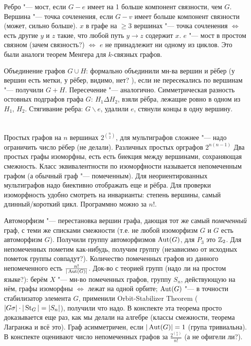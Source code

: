 Ребро "--- мост, если $G-e$ имеет на 1 больше компонент связности, чем $G$.
Вершина "--- точка сочленения, если $G-v$ имеет больше компонент связности (может, сильно больше).
$x$ в графе на $\ge 3$ вершинах "--- точка сочленения $\iff$ есть другие $y$ и $z$ такие, что любой путь $y\to z$ содержит $x$.
$e$ "--- мост в простом связном (\TODO зачем связность?) $\iff$ $e$ не принадлежит ни одному из циклов.
Это были аналоги теорем Менгера для $k$-связных графов.

Объединение графов $G\cup H$: формально объединили мн-ва вершин и рёбер (у вершин есть метки, у рёбер, видимо, нет? \TODO), если не пересекались по вершинам "--- получили $G+H$.
Пересечение "--- аналогично.
Симметрическая разность остовных подграфов графа $G$: $H_1 \Delta H_2$, взяли рёбра, лежащие ровно в одном из $H_1$, $H_2$.
Стягивание ребра: $G \backslash e$, удалили $e$, стянули концы в одну вершину.

\section{} %
Простых графов на $n$ вершинах $2^{\binom{n}{2}}$, для мультиграфов сложнее "--- надо ограничить число рёбер (не делали).
Различных простых орграфов $2^{n(n-1)}$
Два простых графы изоморфны, есть есть биекция между вершинами, сохраняющая смежность.
Класс эквивалентности по изоморфности называется непомеченным графом (а обычный граф "--- помеченным).
Для неориентированных мультиграфов надо биективно отображать еще и рёбра.
Для проверки изоморфность удобно смотреть на инварианты: степень вершины, самый длинный/короткий цикл.
Программно можно за $n!$.

Автоморфизм "--- перестановка вершин графа, дающая тот же самый \textit{помеченный} граф, с теми же списками смежности (т.е. не любой изоморфизм $G$ и $G$ есть автоморфизм $G$).
Получили группу автоморфизмов $\operatorname{Aut}(G)$, для $P_3$ это $\mathbb{Z}_2$.
Для непомеченных пометим как-нибудь, получим группу (\TODO независимо от исходных пометок группы совпадут?).
Количество помеченных графов из данного непомеченного есть $\frac{n!}{|\operatorname{Aut}(G)|}$.
Док-во с теорией групп (\TODO надо ли на простом языке?): берём $X$ "--- мн-во помеченных графов, группу $S_n$, действующую на нём, графы изоморфны $\iff$ лежат на одной орбите;
$\operatorname{Aut}(G)$ "--- в точности стабилизатор элемента $G$, применили Orbit-Stabilizer Theorem ($|G\sigma| \cdot |\operatorname{St}_G| = |S_n|$), получили что надо.
В конспекте эта теорема просто доказывается еще раз, как мы делали на алгебре (классы смежности, теорема Лагранжа и всё это).
Граф асимметричен, если $|\operatorname{Aut}(G)|=1$ (група тривиальна).
В конспекте оценивают число непомеченных графов за $\frac{2^{\binom{n}{2}}}{n!}$ (\TODO а не офигели ли?).
